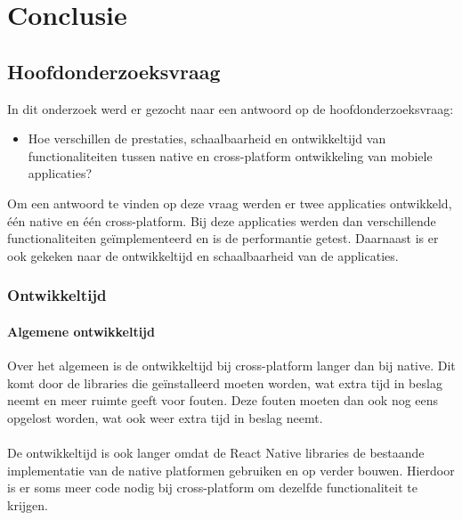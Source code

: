 
\chapter{Conclusie}%
\label{ch:conclusie}


\section{Hoofdonderzoeksvraag}
In dit onderzoek werd er gezocht naar een antwoord op de hoofdonderzoeksvraag:
\begin{itemize}
    \item Hoe verschillen de prestaties, schaalbaarheid en ontwikkeltijd van functionaliteiten tussen native en cross-platform ontwikkeling van mobiele applicaties?
\end{itemize}
Om een antwoord te vinden op deze vraag werden er twee applicaties ontwikkeld, één native en één cross-platform.
Bij deze applicaties werden dan verschillende functionaliteiten geïmplementeerd en is de performantie getest. 
Daarnaast is er ook gekeken naar de ontwikkeltijd en schaalbaarheid van de applicaties. 

\subsection{Ontwikkeltijd}
\subsubsection{Algemene ontwikkeltijd}
Over het algemeen is de ontwikkeltijd bij cross-platform langer dan bij native.
Dit komt door de libraries die geïnstalleerd moeten worden, wat extra tijd in beslag neemt en meer 
ruimte geeft voor fouten. Deze fouten moeten dan ook nog eens opgelost worden, wat ook weer extra tijd in beslag neemt.
\\\\
De ontwikkeltijd is ook langer omdat de React Native libraries de bestaande implementatie van de 
native platformen gebruiken en op verder bouwen. Hierdoor is er soms meer code nodig bij 
cross-platform om dezelfde functionaliteit te krijgen.

